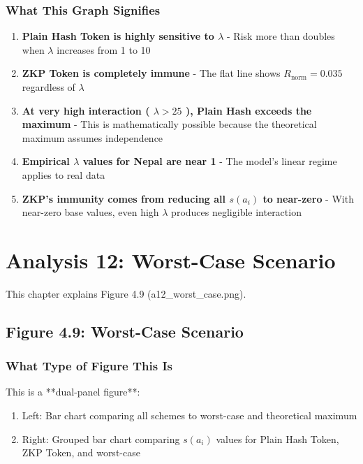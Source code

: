 \documentclass[12pt,a4paper,oneside,openany]{report}
\begin{document}
\begin{enumerate}
\subsection{What This Graph Signifies}
\begin{enumerate}
    \item \textbf{Plain Hash Token is highly sensitive to $\lambda$} - Risk more than doubles when $\lambda$ increases from 1 to 10
    \item \textbf{ZKP Token is completely immune} - The flat line shows $R_{\mathrm{norm}}=0.035$ regardless of $\lambda$
    \item \textbf{At very high interaction ( $\lambda>25$ ), Plain Hash exceeds the maximum} - This is mathematically possible because the theoretical maximum assumes independence
    \item \textbf{Empirical $\lambda$ values for Nepal are near 1} - The model's linear regime applies to real data
    \item \textbf{ZKP's immunity comes from reducing all $s(a_i)$ to near-zero} - With near-zero base values, even high $\lambda$ produces negligible interaction
\end{enumerate}

\chapter{Analysis 12: Worst-Case Scenario}
\label{sec:a12}

This chapter explains Figure 4.9 (a12\_worst\_case.png).

\section{Figure 4.9: Worst-Case Scenario}
\label{sec:f4.9}

\subsection{What Type of Figure This Is}
This is a **dual-panel figure**:
\begin{enumerate}
    \item Left: Bar chart comparing all schemes to worst-case and theoretical maximum
    \item Right: Grouped bar chart comparing $s(a_i)$ values for Plain Hash Token, ZKP Token, and worst-case
\end{enumerate}


\end{enumerate}
\end{document}
